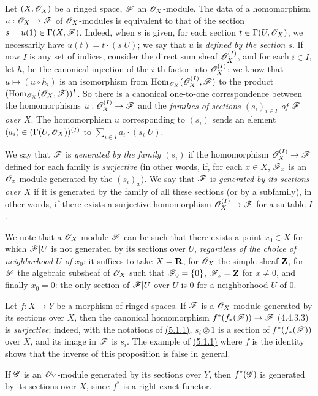\begin{env}[5.1.1]
\label{env-0.5.1.1}
Let $(X,\mathscr{O}_X)$ be a ringed space, $\mathscr{F}$ an $\mathscr{O}_X$-module. The data of a homomorphism
$u:\mathscr{O}_X\to\mathscr{F}$ of $\mathscr{O}_X$-modules is equivalent to that of the section
$s=u(1)\in\Gamma(X,\mathscr{F})$. Indeed, when $s$ is given, for each section
$t\in\Gamma(U,\mathscr{O}_X)$, we necessarily have $u(t)=t\cdot(s|U)$; we say that $u$ is
{\em defined by the section $s$}. If now $I$ is any set of indices, consider the direct
sum sheaf $\mathscr{O}_X^{(I)}$, and for each $i\in I$, let $h_i$ be the canonical injection of
the $i$-th factor into $\mathscr{O}_X^{(I)}$; we know that $u\mapsto(u\circ h_i)$ is an isomorphism
from ${\mathop{\mathrm{Hom}}\nolimits}_{\mathscr{O}_X}(\mathscr{O}_X^{(I)},\mathscr{F})$ to the product $({\mathop{\mathrm{Hom}}\nolimits}_{\mathscr{O}_X}(\mathscr{O}_X,\mathscr{F}))^I$. So
there is a canonical one-to-one correspondence between the homomorphisms
$u:\mathscr{O}_X^{(I)}\to\mathscr{F}$ and the {\em families of sections $(s_i)_{i\in I}$ of $\mathscr{F}$ over
$X$}. The homomorphism $u$ corresponding to $(s_i)$ sends an element
$(a_i)\in(\Gamma(U,\mathscr{O}_X))^{(I)}$ to $\sum_{i\in I}a_i\cdot(s_i|U)$.

We say that $\mathscr{F}$ is {\em generated by the family $(s_i)$} if the homomorphism
$\mathscr{O}_X^{(I)}\to\mathscr{F}$ defined
for each family is {\em surjective} (in other words, if, for each $x\in X$, $\mathscr{F}_x$ is an
$\mathscr{O}_x$-module generated by the $(s_i)_x$). We say that $\mathscr{F}$ is {\em generated by its
sections over $X$} if it is generated by the family of all these sections (or by a
subfamily), in other words, if there exists a surjective homomorphism $\mathscr{O}_X^{(I)}\to\mathscr{F}$
for a suitable $I$.

We note that a $\mathscr{O}_X$-module $\mathscr{F}$ can be such that there exists a point $x_0\in X$ for
which $\mathscr{F}|U$ is not generated by its sections over $U$, {\em regardless of the choice
of neighborhood $U$ of $x_0$}: it suffices to take $X=\mathbf{R}$, for $\mathscr{O}_X$ the simple sheaf
$\mathbf{Z}$, for $\mathscr{F}$ the algebraic subsheaf of $\mathscr{O}_X$ such that $\mathscr{F}_0=\{0\}$,
$\mathscr{F}_x=\mathbf{Z}$ for $x\neq 0$, and finally $x_0=0$: the only section of $\mathscr{F}|U$ over $U$
is $0$ for a neighborhood $U$ of $0$.
\end{env}

\begin{env}[5.1.2]
\label{env-0.5.1.2}
Let $f:X\to Y$ be a morphism of ringed spaces. If $\mathscr{F}$ is a $\mathscr{O}_X$-module generated by
its sections over $X$, then the canonical homomorphism $f^*(f_*(\mathscr{F}))\to\mathscr{F}$ (4.4.3.3)
is {\em surjective}; indeed, with the notations of \hyperref[env-0.5.1.1]{(5.1.1)}, $s_i\otimes 1$ is a
section of $f^*(f_*(\mathscr{F}))$ over $X$, and its image in $\mathscr{F}$ is $s_i$. The example of
\hyperref[env-0.5.1.1]{(5.1.1)} where $f$ is the identity shows that the inverse of this proposition is
false in general.

If $\mathscr{G}$ is an $\mathscr{O}_Y$-module generated by its sections over $Y$, then $f^*(\mathscr{G})$ is
generated by its sections over $X$, since $f^*$ is a right exact functor.
\end{env}

